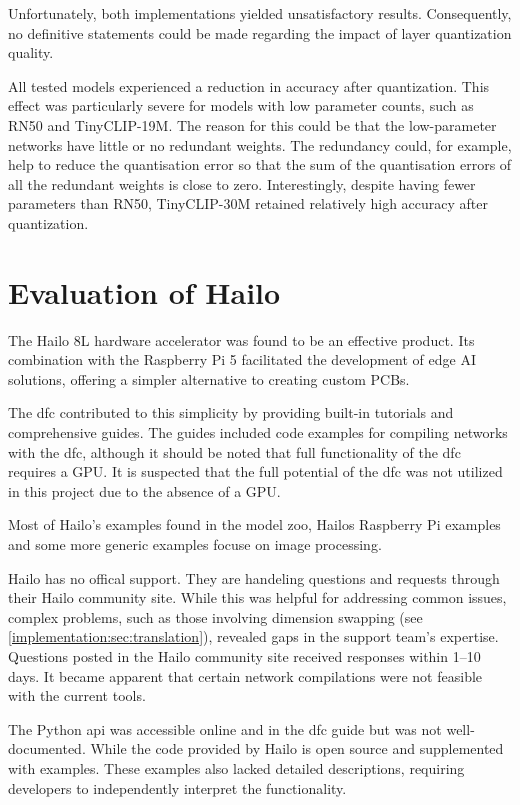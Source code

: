 Unfortunately, both implementations yielded unsatisfactory results.  
Consequently, no definitive statements could be made regarding the impact of layer quantization quality.  

All tested models experienced a reduction in accuracy after quantization.  
This effect was particularly severe for models with low parameter counts, such as RN50 and TinyCLIP-19M.
The reason for this could be that the low-parameter networks have little or no redundant weights.
The redundancy could, for example, help to reduce the quantisation error so that the sum of the quantisation errors of all the redundant weights is close to zero.
Interestingly, despite having fewer parameters than RN50, TinyCLIP-30M retained relatively high accuracy after quantization.    

\section{Evaluation of Hailo}  
The Hailo 8L hardware accelerator was found to be an effective product.  
Its combination with the Raspberry Pi 5 facilitated the development of edge AI solutions, offering a simpler alternative to creating custom PCBs.  

The \acrshort{dfc} contributed to this simplicity by providing built-in tutorials and comprehensive guides.  
The guides included code examples for compiling networks with the \acrshort{dfc}, although it should be noted that full functionality of the \acrshort{dfc} requires a GPU. 
It is suspected that the full potential of the \acrshort{dfc} was not utilized in this project due to the absence of a GPU.  

Most of Hailo's examples found in the model zoo\cite{hailo_model_zoo}, Hailos Raspberry Pi examples\cite{hailo_rpi5_examples} and some more generic examples\cite{hailo_application_code_examples} focuse on image processing.

Hailo has no offical support.
They are handeling questions and requests through their Hailo community site.  
While this was helpful for addressing common issues, complex problems, such as those involving dimension swapping (see \cref{implementation:sec:translation}), revealed gaps in the support team's expertise.
Questions posted in the Hailo community site received responses within 1–10 days. 
It became apparent that certain network compilations were not feasible with the current tools.  

The Python \acrfull{api} was accessible online and in the \acrshort{dfc} guide but was not well-documented.  
While the code provided by Hailo is open source and supplemented with examples.
These examples also lacked detailed descriptions, requiring developers to independently interpret the functionality.  
 

